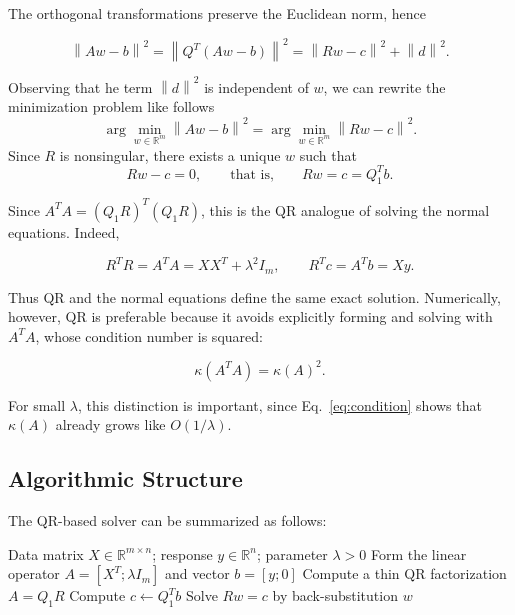 \documentclass[11pt,a4paper]{article}
\newcommand{\R}{\mathbb{R}}
\newcommand{\norm}[1]{\left\|#1\right\|}
\begin{document}
The orthogonal transformations preserve the Euclidean norm, hence

\begin{equation}
\label{eq:qr_residual_split}
    \norm{Aw-b}^2
    =
    \norm{Q^T(Aw-b)}^2
    =
    \norm{Rw-c}^2 + \norm{d}^2.
\end{equation}

Observing that he term $\norm{d}^2$ is independent of $w$, we can rewrite the minimization problem like follows
\begin{equation}
\label{eq:qr_triangular_solve}
    \arg\min_{w\in\R^m} \norm{Aw-b}^2
    =
    \arg\min_{w\in\R^m} \norm{Rw-c}^2.
\end{equation}
Since $R$ is nonsingular, there exists a unique $w$ such that
\begin{equation}
    Rw-c=0,
    \qquad\text{that is,}\qquad
    Rw=c=Q_1^Tb.
\end{equation}

Since $A^TA = (Q_1R)^T(Q_1R)$, this is the QR analogue of solving the normal equations. Indeed,

\begin{equation}
\label{eq:qr_normal_equivalence}
    R^T R = A^T A = XX^T + \lambda^2 I_m,
    \qquad
    R^T c = A^T b = Xy.
\end{equation}

Thus QR and the normal equations define the same exact solution. Numerically, however, 
QR is preferable because it avoids explicitly forming and solving with $A^T A$, whose 
condition number is squared:

\begin{equation}
    \kappa(A^T A) = \kappa(A)^2.
\end{equation}

For small $\lambda$, this distinction is important, since Eq.~\eqref{eq:condition} 
shows that $\kappa(A)$ already grows like $O(1/\lambda)$.

\subsection{Algorithmic Structure}

The QR-based solver can be summarized as follows:

\begin{algorithm}[H]
\caption{QR Solver for the Regularized Least Squares Problem}
\label{alg:qr_solver}
\begin{algorithmic}[1]
    \Require Data matrix $X\in\R^{m\times n}$; response $y\in\R^n$; parameter $\lambda>0$
    \State Form the linear operator $A = [X^T;\lambda I_m]$ and vector $b=[y;0]$
    \State Compute a thin QR factorization $A=Q_1R$
    \State Compute $c \gets Q_1^Tb$
    \State Solve $Rw=c$ by back-substitution
    \State \Return $w$
\end{algorithmic}
\end{algorithm}
\end{document}
